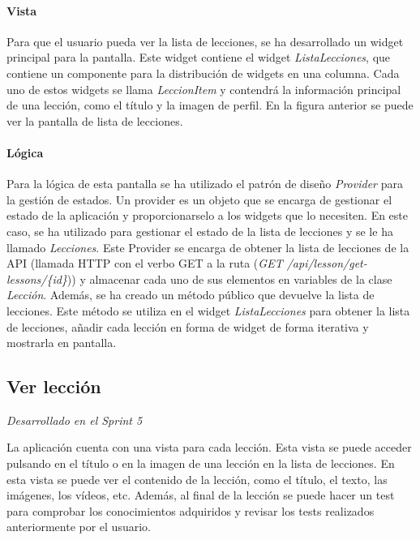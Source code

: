 \newpage

\paragraph*{Vista}
Para que el usuario pueda ver la lista de lecciones, se ha desarrollado un widget principal para la pantalla. Este widget contiene el widget \textit{ListaLecciones}, 
que contiene un componente para la distribución de widgets en una columna. Cada uno de estos widgets se llama \textit{LeccionItem} y contendrá la
 información principal de una lección, como el título y la imagen de perfil. En la figura anterior se puede ver la pantalla de lista de lecciones.

\paragraph*{Lógica}
Para la lógica de esta pantalla se ha utilizado el patrón de diseño \textit{Provider} para la gestión de estados. Un provider es un objeto que se 
encarga de gestionar el estado de la aplicación y proporcionarselo a los widgets que lo necesiten.
En este caso, se ha utilizado para gestionar el estado de la lista de lecciones y se le ha llamado \textit{Lecciones}.
Este Provider se encarga de obtener la lista de lecciones de la API (llamada HTTP con el verbo GET a la ruta (\textit{GET /api/lesson/get-lessons/\{id\}}))
 y almacenar cada uno de sus elementos en variables de la clase \textit{Lección}. Además, se ha creado un método público que devuelve la lista de lecciones. 
 Este método se utiliza en el widget \textit{ListaLecciones} para obtener la lista de lecciones, añadir cada lección en forma de widget de forma iterativa
 y mostrarla en pantalla. 

\subsection{Ver lección} 
\textit{Desarrollado en el Sprint 5}
\label{sec:leccion}

La aplicación cuenta con una vista para cada lección. Esta vista se puede acceder pulsando en el título o en la imagen de una lección en la lista de lecciones.
 En esta vista se puede ver el contenido de la lección, como el título, el texto, las imágenes, los vídeos, etc.
Además, al final de la lección se puede hacer un test para comprobar los conocimientos adquiridos y revisar los tests realizados anteriormente por el usuario.

